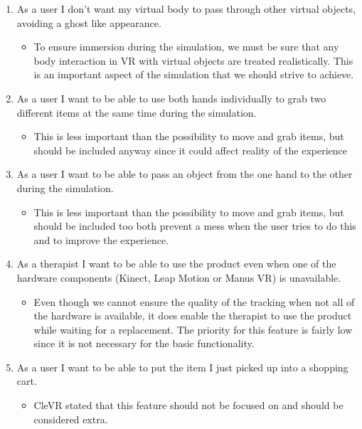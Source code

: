 \documentclass[11pt,a4paper]{report}
\begin{document}
\begin{enumerate}
\begin{itemize}
\end{itemize}
\item As a user I don’t want my virtual body to pass through other virtual objects, avoiding a ghost like appearance.
\begin{itemize}
\item To ensure immersion during the simulation, we must be sure that any body interaction in VR with virtual objects are treated realistically. This is an important aspect of the simulation that we should strive to achieve.
\end{itemize}
\item As a user I want to be able to use both hands individually to grab two different items at the same time during the simulation.
\begin{itemize}
\item This is less important than the possibility to move and grab items, but should be included anyway since it could affect reality of the experience
\end{itemize}
\item As a user I want to be able to pass an object from the one hand to the other during the simulation.
\begin{itemize}
\item This is less important than the possibility to move and grab items, but should be included too both prevent a mess when the user tries to do this and to improve the experience.
\end{itemize}
\item As a therapist I want to be able to use the product even when one of the hardware components (Kinect, Leap Motion or Manus VR) is unavailable.
\begin{itemize}
\item Even though we cannot ensure the quality of the tracking when not all of the hardware is available, it does enable the therapist to use the product while waiting for a replacement. The priority for this feature is fairly low since it is not necessary for the basic functionality. 
\end{itemize}
\item As a user I want to be able to put the item I just picked up into a shopping cart.
\begin{itemize}
\item CleVR stated that this feature should not be focused on and should be considered extra. 
\end{itemize}

\end{enumerate}
\end{document}
